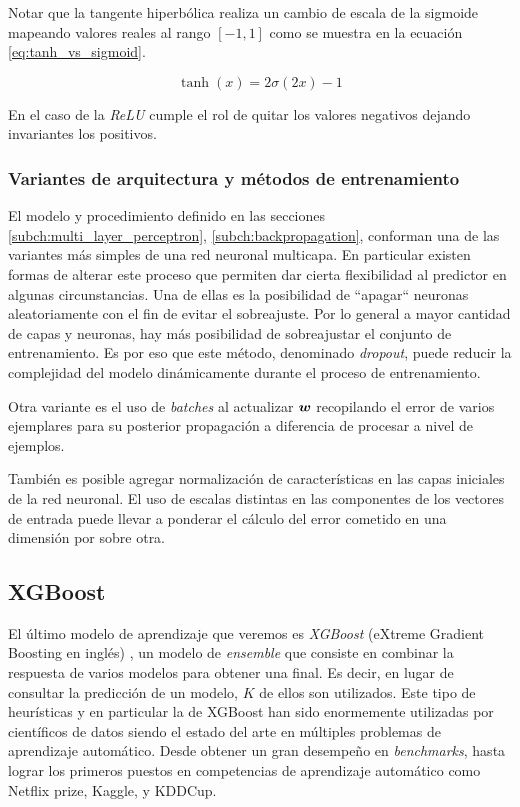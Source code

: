 Notar que la tangente hiperbólica realiza un cambio de escala de la sigmoide
mapeando valores reales al rango $[-1, 1]$ como se muestra en la ecuación
\ref{eq:tanh_vs_sigmoid}.

\begin{equation} \label{eq:tanh_vs_sigmoid}
    \tanh\left( x \right) = 2 \sigma(2x) - 1
\end{equation}

En el caso de la \emph{ReLU} cumple el rol de quitar los valores negativos
dejando invariantes los positivos.

\subsubsection{Variantes de arquitectura y métodos de entrenamiento}

El modelo y procedimiento definido en las secciones
\ref{subch:multi_layer_perceptron}, \ref{subch:backpropagation}, conforman una
de las variantes más simples de una red neuronal multicapa. En particular
existen formas de alterar este proceso que permiten dar cierta flexibilidad al
predictor en algunas circunstancias. Una de ellas es la posibilidad de
``apagar`` neuronas aleatoriamente con el fin de evitar el sobreajuste. Por lo
general a mayor cantidad de capas y neuronas, hay más posibilidad de
sobreajustar el conjunto de entrenamiento. Es por eso que este método,
denominado \emph{dropout}, puede reducir la complejidad del modelo dinámicamente
durante el proceso de entrenamiento.

Otra variante es el uso de \emph{batches} al actualizar $\boldsymbol{w}$ recopilando
el error de varios ejemplares para su posterior propagación a diferencia de
procesar a nivel de ejemplos.

También es posible agregar normalización de características en las capas
iniciales de la red neuronal. El uso de escalas distintas en las componentes de
los vectores de entrada puede llevar a ponderar el cálculo del error cometido en
una dimensión por sobre otra.

\subsection{XGBoost}
\label{alg:xgboost}

El último modelo de aprendizaje que veremos es \emph{XGBoost} (eXtreme Gradient
Boosting en inglés) \citep{Tianqi-2016}, un modelo de \emph{ensemble} que consiste
en combinar la respuesta de varios modelos para obtener una final. Es decir, en
lugar de consultar la predicción de un modelo, $K$ de ellos son utilizados. Este
tipo de heurísticas y en particular la de XGBoost han sido enormemente
utilizadas por científicos de datos siendo el estado del arte en múltiples
problemas de aprendizaje automático. Desde obtener un gran desempeño en
\emph{benchmarks}, hasta lograr los primeros puestos en competencias de
aprendizaje automático como Netflix prize, Kaggle, y KDDCup.

